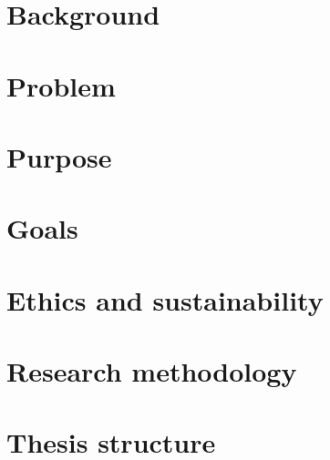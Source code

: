 

\section{Background}
    \label{sec:background}
    

\section{Problem}
    \label{sec:problem}
    

\section{Purpose}
    \label{sec:purpose}
    

\section{Goals}
    \label{sec:goals}
    

\section{Ethics and sustainability}
    \label{sec:ethics_and_sustainability}
    

\section{Research methodology}
    \label{sec:research_methodology}
    

\section{Thesis structure}
    \label{sec:structure_thesis}
    